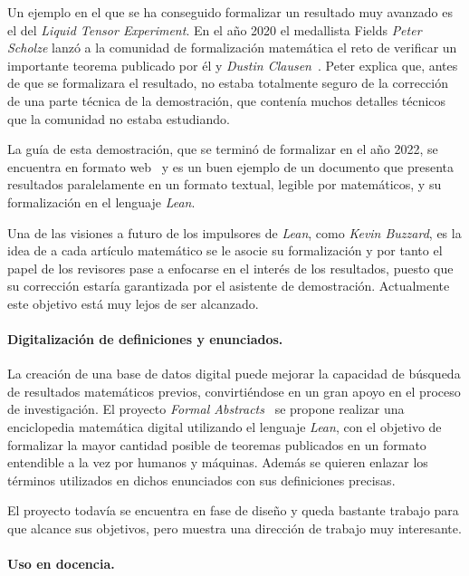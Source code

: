 Un ejemplo en el que se ha conseguido formalizar un resultado muy avanzado es el
del \textit{Liquid Tensor Experiment}. En el año 2020 el medallista Fields
\textit{Peter Scholze} lanzó a la comunidad de formalización matemática el reto
de verificar un importante teorema publicado por él y \textit{Dustin
	Clausen}~\cite{scholzeLiquidTensorExperiment2022}. Peter explica que, antes de
que se formalizara el resultado, no estaba totalmente seguro de la corrección de
una parte técnica de la demostración, que contenía muchos detalles técnicos que
la comunidad no estaba estudiando.

La guía de esta demostración, que se terminó de formalizar en el año 2022, se
encuentra en formato web~\cite{scholzeBlueprintLiquidTensor} y es un buen
ejemplo de un documento que presenta resultados paralelamente en un formato
textual, legible por matemáticos, y su formalización en el lenguaje
\textit{Lean}.

Una de las visiones a futuro de los impulsores de \textit{Lean}, como
\textit{Kevin Buzzard}, es la idea de a cada artículo matemático se le asocie su
formalización y por tanto el papel de los revisores pase a enfocarse en el
interés de los resultados, puesto que su corrección estaría garantizada por el
asistente de demostración. Actualmente este objetivo está muy lejos de ser
alcanzado.

\paragraph{Digitalización de definiciones y enunciados.}

La creación de una base de datos digital puede mejorar la capacidad de búsqueda
de resultados matemáticos previos, convirtiéndose en un gran apoyo en el proceso
de investigación. El proyecto \textit{Formal Abstracts}~\cite{halesFormalAbstracts}
se propone realizar una enciclopedia matemática digital utilizando el lenguaje
\textit{Lean}, con el objetivo de formalizar la mayor cantidad posible de
teoremas publicados en un formato entendible a la vez por humanos y máquinas.
Además se quieren enlazar los términos utilizados en dichos enunciados con sus
definiciones precisas.

El proyecto todavía se encuentra en fase de diseño y queda bastante trabajo para
que alcance sus objetivos, pero muestra una dirección de trabajo muy
interesante.

\paragraph{Uso en docencia.}

